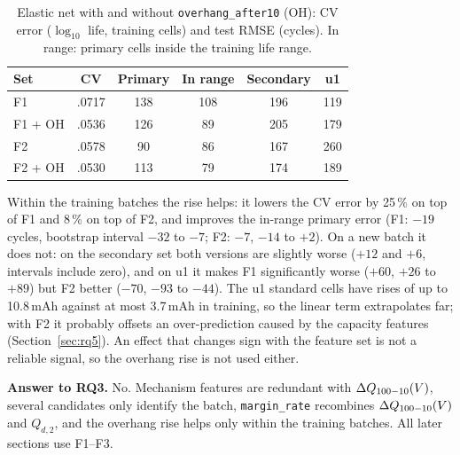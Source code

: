 \begin{table}[!htb]
\centering
\caption{Elastic net with and without \texttt{overhang\_after10} (OH): CV
error ($\log_{10}$ life, training cells) and test RMSE (cycles). In range:
primary cells inside the training life range.}
\label{tab:overhang}
\small
\setlength{\tabcolsep}{3.5pt}
\begin{tabular}{@{}lccccc@{}}
\toprule
Set & CV & Primary & In range & Secondary & u1 \\
\midrule
F1 & .0717 & 138 & 108 & 196 & 119 \\
F1 + OH & .0536 & 126 & 89 & 205 & 179 \\
\midrule
F2 & .0578 & 90 & 86 & 167 & 260 \\
F2 + OH & .0530 & 113 & 79 & 174 & 189 \\
\bottomrule
\end{tabular}
\end{table}

Within the training batches the rise helps: it lowers the CV error by 25\,\%
on top of F1 and 8\,\% on top of F2, and improves the in-range primary error
(F1: $-19$ cycles, bootstrap interval $-32$ to $-7$; F2: $-7$, $-14$ to $+2$).
On a new batch it does not: on the secondary set both versions are slightly
worse ($+12$ and $+6$, intervals include zero), and on u1 it makes F1
significantly worse ($+60$, $+26$ to $+89$) but F2 better ($-70$, $-93$ to
$-44$). The u1 standard cells have rises of up to 10.8\,mAh against at most
3.7\,mAh in training, so the linear term extrapolates far; with F2 it probably
offsets an over-prediction caused by the capacity features
(Section~\ref{sec:rq5}). An effect that changes sign with the feature set is
not a reliable signal, so the overhang rise is not used either.

\textbf{Answer to RQ3.} No. Mechanism features are redundant with $\Delta Q_{100-10}(V)$,
several candidates only identify the batch, \texttt{margin\_rate} recombines
$\Delta Q_{100-10}(V)$ and $Q_{d,2}$, and the overhang rise helps only within the training
batches. All later sections use F1--F3.
